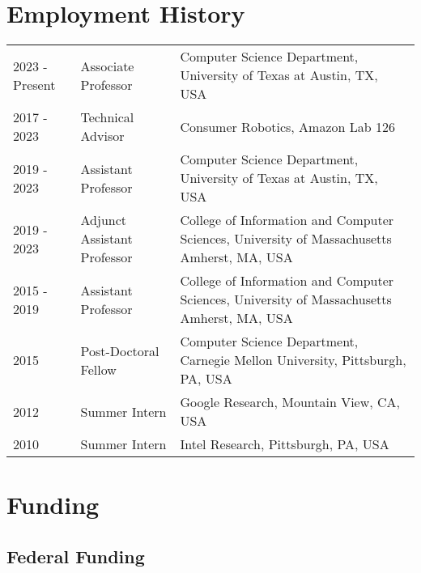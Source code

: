 \documentclass[Times]{article}
\begin{document}
%


\section*{Employment History}
\begin{tabular}{ p{2cm} l p{8cm}}
  2023 - Present & Associate Professor & Computer Science Department,
  University of Texas at Austin, TX, USA \\
  2017 - 2023 & Technical Advisor &  Consumer Robotics, Amazon Lab 126\\
  2019 - 2023 & Assistant Professor & Computer Science Department,
  University of Texas at Austin, TX, USA \\
  2019 - 2023 & Adjunct Assistant Professor &  College of Information and Computer Sciences, University of Massachusetts Amherst, MA, USA\\
  2015 - 2019  & Assistant Professor &  College of Information and Computer Sciences, University of Massachusetts Amherst, MA, USA\\
  2015 & Post-Doctoral Fellow &  Computer Science Department, Carnegie Mellon University, Pittsburgh, PA, USA\\
  2012 & Summer Intern &  Google Research, Mountain View, CA, USA\\
  2010 & Summer Intern &  Intel Research, Pittsburgh, PA, USA\\
\end{tabular}


\section*{Funding}

\subsection*{Federal Funding}
\end{document}
